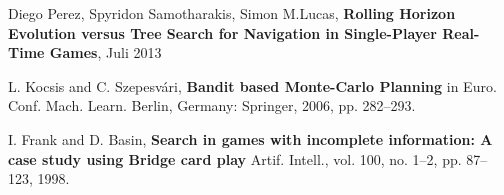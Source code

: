 \begin{thebibliography}{99}
Diego Perez, Spyridon Samotharakis, Simon M.Lucas,
\textbf{Rolling Horizon Evolution versus Tree Search for Navigation in Single-Player Real-Time Games},
Juli 2013

L. Kocsis and C. Szepesvári, \textbf{Bandit based Monte-Carlo Planning} in Euro. Conf. Mach. Learn. Berlin, Germany: Springer, 2006, pp. 282–293.

I. Frank and D. Basin, \textbf{Search in games with incomplete information: A case study using Bridge card play}
Artif. Intell., vol. 100, no. 1–2,
pp. 87–123, 1998.




\end{thebibliography}
